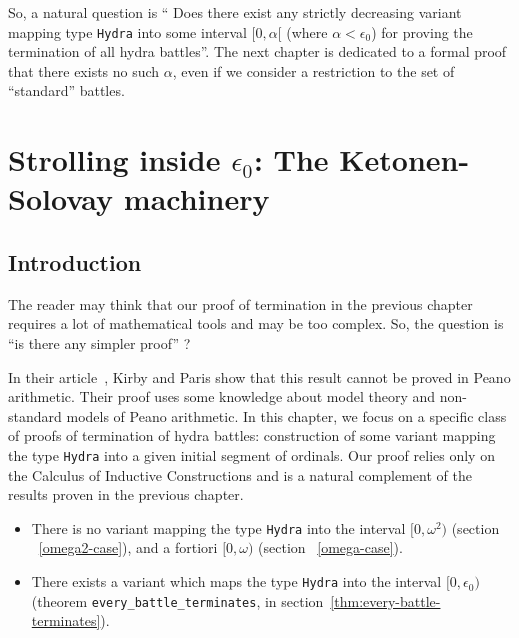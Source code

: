 \documentclass[a4paper]{book}
\begin{document}
So, a  natural question is `` Does there exist any strictly decreasing variant mapping
type \texttt{Hydra} into some interval $[0,\alpha[$ (where $\alpha <\epsilon_0$) for proving the termination of all hydra battles''. The next chapter is dedicated to a formal proof that there exists no such $\alpha$, even if we consider a restriction to the set of ``standard'' battles.






%


%





\chapter[The Ketonen-Solovay machinery]{Strolling inside \texorpdfstring{$\epsilon_0$}{epsilon0}: The Ketonen-Solovay machinery\label{ks-chapter}}
\label{chap:ketonen}

\section{Introduction}
The reader may think that our proof of termination in the previous  chapter requires a lot of mathematical tools and may be too  complex. So, the question is ``is there  any  simpler proof'' ?

In their article~\cite{KP82}, Kirby and Paris show that this result cannot be proved in Peano arithmetic. Their proof uses some knowledge about model theory and non-standard models of Peano arithmetic. In this chapter, we focus on a specific class of proofs of termination of hydra battles: construction of some variant mapping the type \texttt{Hydra} into a given initial  segment of ordinals. Our proof relies only on the Calculus of Inductive Constructions and is a natural complement of the results proven in the previous chapter.

\begin{itemize}
\item There is no variant mapping the type \texttt{Hydra} into the interval $[0,\omega^2)$ (section ~\vref{omega2-case}), and a fortiori 
$[0,\omega)$ (section ~\vref{omega-case}).

\item There exists a variant which maps the type \texttt{Hydra} into the
interval $[0,\epsilon_0)$ (theorem \texttt{every\_battle\_terminates}, in section~\vref{thm:every-battle-terminates}).
\end{itemize}
\end{document}
